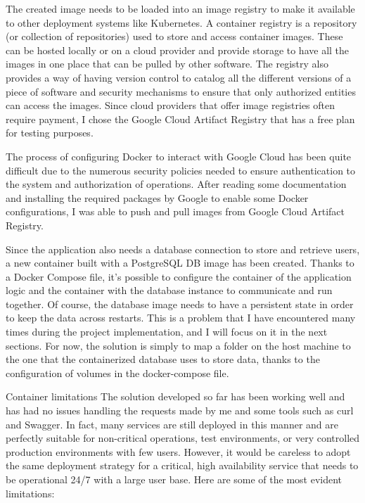\documentclass[sigplan,screen]{acmart}
\begin{document}
The created image needs to be loaded into an image registry to make it available to other deployment systems like Kubernetes. A container registry is a repository (or collection of repositories) used to store and access container images. These can be hosted locally or on a cloud provider and provide storage to have all the images in one place that can be pulled by other software. The registry also provides a way of having version control to catalog all the different versions of a piece of software and security mechanisms to ensure that only authorized entities can access the images. Since cloud providers that offer image registries often require payment, I chose the Google Cloud Artifact Registry that has a free plan for testing purposes.

The process of configuring Docker to interact with Google Cloud has been quite difficult due to the numerous security policies needed to ensure authentication to the system and authorization of operations. After reading some documentation and installing the required packages by Google to enable some Docker configurations, I was able to push and pull images from Google Cloud Artifact Registry.

Since the application also needs a database connection to store and retrieve users, a new container built with a PostgreSQL DB image has been created. Thanks to a Docker Compose file, it's possible to configure the container of the application logic and the container with the database instance to communicate and run together. Of course, the database image needs to have a persistent state in order to keep the data across restarts. This is a problem that I have encountered many times during the project implementation, and I will focus on it in the next sections. For now, the solution is simply to map a folder on the host machine to the one that the containerized database uses to store data, thanks to the configuration of volumes in the docker-compose file.

Container limitations
The solution developed so far has been working well and has had no issues handling the requests made by me and some tools such as curl and Swagger. In fact, many services are still deployed in this manner and are perfectly suitable for non-critical operations, test environments, or very controlled production environments with few users. However, it would be careless to adopt the same deployment strategy for a critical, high availability service that needs to be operational 24/7 with a large user base. Here are some of the most evident limitations:
\end{document}
